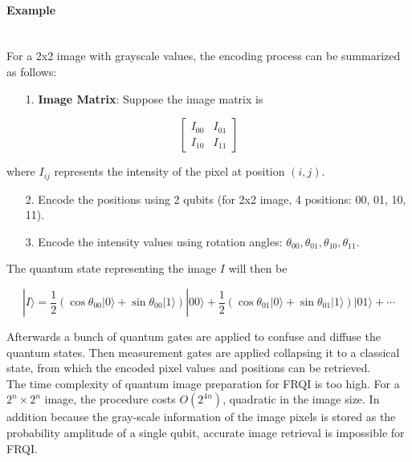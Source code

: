 \documentclass[svgnames]{article}     %
\begin{document}
\paragraph{Example} \mbox{} \\

For a 2x2 image with grayscale values, the encoding process can be summarized
as follows: 

\begin{itemize}
  \item[1.] \textbf{Image Matrix}: Suppose the image matrix is
\end{itemize}
\[
\begin{bmatrix}
  I_{00} & I_{01} \\ I_{10} & I_{11}
\end{bmatrix}
\] \vspace{3px}

where $I_{ij}$ represents the intensity of the pixel at position  $(i, j)$. 

 \begin{itemize}
   \item[2.] Encode the positions using 2 qubits (for 2x2 image, 4 positions:
     00, 01, 10, 11). 
    \item[3.] Encode the intensity values using rotation angles: $\theta_{00},
      \theta_{01}, \theta_{10}, \theta_{11}$. 
\end{itemize}

The quantum state representing the image $I$ will then be 

\[
|I\rangle = \frac{1}{2}\left( \cos\theta_{00}| 0 \rangle
+ \sin\theta_{00}| 1 \rangle \right) |00\rangle + \frac{1}{2}\left(
\cos\theta_{01}| 0 \rangle + \sin\theta_{01} | 1 \rangle \right)|01\rangle
+ \cdots
\] \vspace{3px}



Afterwards a bunch of quantum gates are applied to confuse and
diffuse the quantum states. Then measurement gates are applied collapsing it to
a classical state, from which the encoded pixel values and positions can be
retrieved. \\

The time complexity of quantum image preparation for FRQI is too high. For
a $2^n \times 2^n$ image, the procedure costs  $O(2^{4n})$, quadratic in the
image size. In addition because the gray-scale information of the image pixels
is stored as the probability amplitude of a single qubit, accurate image
retrieval is impossible for FRQI. 
\end{document}
